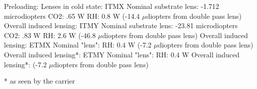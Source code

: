 
\begin{outline}
    \1 Preloading: 
    	\2 Lenses in cold state: 
    		\3 ITMX
    			\4 Nominal substrate lens: -1.712 microdiopters
    			\4 CO2: .65 W 
    			\4 RH: 0.8 W (-14.4 $\mu$diopters from double pass lens)
    			\4 Overall induced lensing: 
    		\3 ITMY
    			\4 Nominal substrate lens: -23.81 microdiopters
    			\4 CO2: .83 W 
    			\4 RH: 2.6 W (-46.8 $\mu$diopters from double pass lens)
    			\4 Overall induced lensing:
    		\3 ETMX
    			\4 Nominal "lens": 
    			\4 RH: 0.4 W (-7.2 $\mu$diopters from double pass lens)
    			\4 Overall induced lensing*:
    		\3 ETMY 
    			\4 Nominal "lens":
    			\4 RH: 0.4 W 
    			\4 Overall induced lensing*: (-7.2 $\mu$diopters from double pass lens)
\end{outline}

* as seen by the carrier
